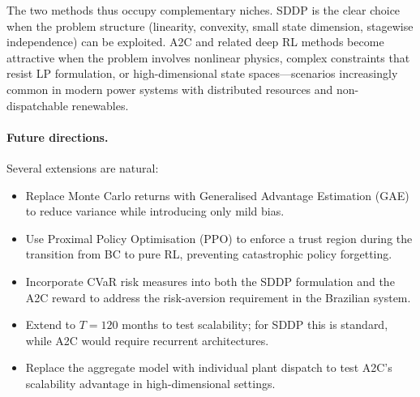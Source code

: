 \documentclass[11pt,letterpaper]{article}
\begin{document}
The two methods thus occupy complementary niches.
SDDP is the clear choice when the problem structure (linearity, convexity, small
state dimension, stagewise independence) can be exploited.
A2C and related deep RL methods become attractive when the problem involves
nonlinear physics, complex constraints that resist LP formulation, or high-dimensional
state spaces---scenarios increasingly common in modern power systems with distributed
resources and non-dispatchable renewables.

\paragraph{Future directions.}
Several extensions are natural:
\begin{itemize}[noitemsep]
  \item Replace Monte Carlo returns with Generalised Advantage Estimation (GAE)
        to reduce variance while introducing only mild bias.
  \item Use Proximal Policy Optimisation (PPO) to enforce a trust region
        during the transition from BC to pure RL, preventing catastrophic
        policy forgetting.
  \item Incorporate CVaR risk measures into both the SDDP formulation and the
        A2C reward to address the risk-aversion requirement in the Brazilian system.
  \item Extend to $T = 120$ months to test scalability; for SDDP this is
        standard, while A2C would require recurrent architectures.
  \item Replace the aggregate model with individual plant dispatch to test
        A2C's scalability advantage in high-dimensional settings.
\end{itemize}

\clearpage


\end{document}
